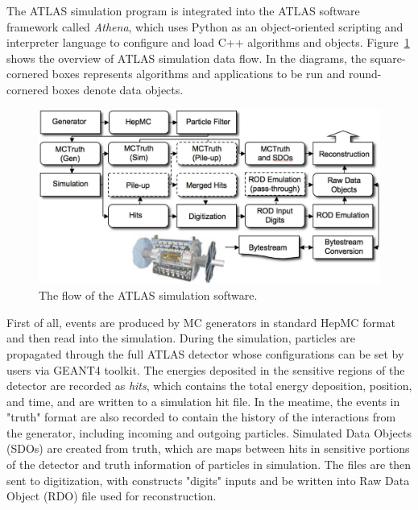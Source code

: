 
The ATLAS simulation program is integrated into the ATLAS software framework called \textit{Athena}\cite{atlas:athena},
which uses Python as an object-oriented scripting and interpreter language to configure and load C++ algorithms and objects.
Figure~\ref{fig:frame_overview} shows the overview of ATLAS simulation data flow\cite{Aad:2010ah}.
In the diagrams, the square-cornered boxes represents algorithms and applications to be run and round-cornered boxes denote data objects.
\begin{figure}[!htb]
  \centering
  \includegraphics[width=1.0\textwidth]{figures/Simulation/outline_atalsSimulation_v2.png}
  \caption{The flow of the ATLAS simulation software.}
  \label{fig:frame_overview}
\end{figure}

First of all, events are produced by MC generators in standard HepMC format and then read into the simulation.
During the simulation, particles are propagated through the full ATLAS detector whose configurations can be set by users via GEANT4 toolkit.
The energies deposited in the sensitive regions of the detector are recorded as \textit{hits}, which contains the total energy deposition,
position, and time, and are written to a simulation hit file.
In the meatime, the events in "truth" format are also recorded to contain the history of the interactions from the generator, including incoming and outgoing particles.
Simulated Data Objects (SDOs) are created from truth, which are maps between hits in sensitive portions of the detector and truth information of particles in simulation.
The files are then sent to digitization, with constructs "digits" inputs and be written into Raw Data Object (RDO) file used for reconstruction.

